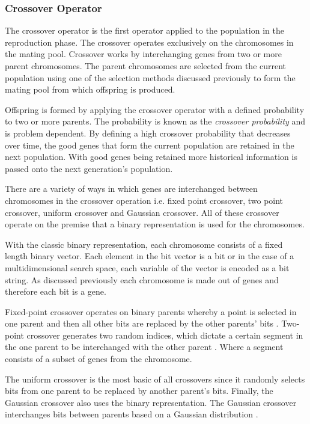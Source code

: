 \subsubsection{Crossover Operator}
\label{sec:crossover}
The crossover operator is the first operator applied to the population in the reproduction phase. The crossover operates exclusively on the chromosomes in the mating pool. Crossover works by interchanging genes from two or more parent chromosomes. The parent chromosomes are selected from the current population using one of the selection methods discussed previously to form the mating pool from which offspring is produced\cite{FamilyGA,HumanPassiveGA,CoactiveFuzzyGA}. 

Offspring is formed by applying the crossover operator with a defined probability to two or more parents. The probability is known as the \emph{crossover probability} and is problem dependent\cite{CompuIntelligenceIntro}. By defining a high crossover probability that decreases over time, the good genes that form the current population are retained in the next population\cite{CompuIntelligenceIntro}. With good genes being retained more historical information is passed onto the next generation's population\cite{FamilyGA}.

There are a variety of ways in which genes are interchanged between chromosomes in the crossover operation i.e. fixed point crossover, two point crossover, uniform crossover and Gaussian crossover\cite{CompuIntelligenceIntro}. All of these crossover operate on the premise that a binary representation is used for the chromosomes. 

With the classic binary representation, each chromosome consists of a fixed length binary vector\cite{CompuIntelligenceIntro}. Each element in the bit vector is a bit or in the case of a multidimensional search space, each variable of the vector is encoded as a bit string. As discussed previously each chromosome is made out of genes and therefore each bit is a gene\cite{CompuIntelligenceIntro}.

Fixed-point crossover operates on binary parents whereby a point is selected in one parent and then all other bits are replaced by the other parents' bits \cite{HumanPassiveGA}. Two-point crossover generates two random indices, which dictate a certain segment in the one parent to be interchanged with the other parent \cite{ConstrainedGA}. Where a segment consists of a subset of genes from the chromosome. 

The uniform crossover is the most basic of all crossovers since it randomly selects bits from one parent to be replaced by another parent's bits\cite{ParallelGASA,GeostatisticalGA}. Finally, the Gaussian crossover also uses the binary representation. The Gaussian crossover interchanges bits between parents based on a Gaussian distribution \cite{ParallelGASA,GeostatisticalGA}.

